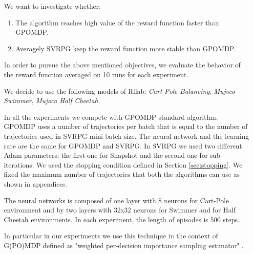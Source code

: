 \documentclass{article}
\theoremstyle{remark}
\theoremstyle{definition}
\begin{document}
We want to investigate whether:
\begin{enumerate}
\item The algorithm reaches high value of the reward function faster than GPOMDP.
\item Averagely SVRPG keep the reward function more stable than GPOMDP.
\end{enumerate}

In order to pursue the above mentioned objectives, we evaluate the behavior of the reward function averaged on 10 runs for each experiment.

We decide to use the following models of Rllab: \emph{Cart-Pole Balancing}, \emph{Mujoco Swimmer}, \emph{Mujoco Half Cheetah}.


In all the experiments we compete with GPOMDP standard algorithm. GPOMDP uses a number of trajectories per batch that is equal to the number of trajectories used in SVRPG mini-batch size.
The neural network and the learning rate are the same for GPOMDP and SVRPG.
In SVRPG we used two different Adam parameters: the first one for Snapshot and the second one for sub-iterations.
We used the stopping condition defined in Section \ref{sec:stopping}.
We fixed the maximum number of trajectories that both the algorithms can use as shown in appendices. 

The neural networks is composed of one layer with 8 neurons for Cart-Pole environment and by two layers with 32x32 neurons for Swimmer and for Half Cheetah environments. In each experiment, the length of episodes is 500 steps.

In particular in our experiments we use this technique in the context of G(PO)MDP defined as "weighted per-decision importance sampling estimator" \cite{precup2000eligibility}.  
\end{document}
